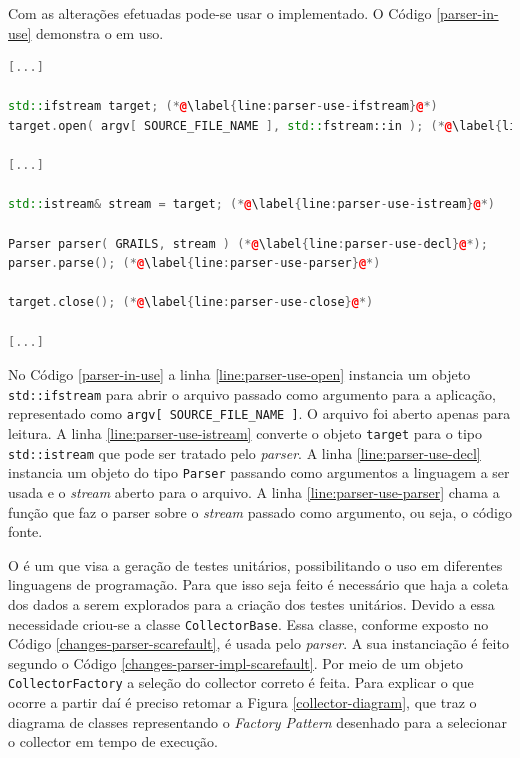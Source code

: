 Com as alterações efetuadas pode-se usar o \parser implementado. O Código
\ref{parser-in-use} demonstra o \parser em uso.

\begin{lstlisting}[language=C++, label=parser-in-use, caption=\textsf{Parser} em uso]
[...]

std::ifstream target; (*@\label{line:parser-use-ifstream}@*)
target.open( argv[ SOURCE_FILE_NAME ], std::fstream::in ); (*@\label{line:parser-use-open}@*)

[...]

std::istream& stream = target; (*@\label{line:parser-use-istream}@*)

Parser parser( GRAILS, stream ) (*@\label{line:parser-use-decl}@*);
parser.parse(); (*@\label{line:parser-use-parser}@*)

target.close(); (*@\label{line:parser-use-close}@*)

[...]
\end{lstlisting}

No Código \ref{parser-in-use} a linha \ref{line:parser-use-open} instancia um
objeto \lstinline|std::ifstream| para abrir o arquivo passado como argumento para
a aplicação, representado como \lstinline|argv[ SOURCE_FILE_NAME ]|. O arquivo foi
aberto apenas para leitura. A linha \ref{line:parser-use-istream} converte o
objeto \lstinline|target| para o tipo \lstinline|std::istream| que pode ser tratado
pelo \textit{parser}. A linha \ref{line:parser-use-decl} instancia um objeto do
tipo \lstinline|Parser| passando como argumentos a linguagem a ser usada e o
\textit{stream} aberto para o arquivo. A linha \ref{line:parser-use-parser} chama
a função que faz o {parser} sobre o \textit{stream} passado como argumento, ou seja,
o código fonte.

O \scarefault é um \framework que visa a geração de testes unitários, possibilitando
o uso em diferentes linguagens de programação. Para que isso seja feito é necessário
que haja a coleta dos dados a serem explorados para a criação dos testes unitários.
Devido a essa necessidade criou-se a classe \lstinline|CollectorBase|. Essa classe,
conforme exposto no Código \ref{changes-parser-scarefault}, é usada pelo \textit{parser}.
A sua instanciação é feito segundo o Código \ref{changes-parser-impl-scarefault}. Por
meio de um objeto \lstinline|CollectorFactory| a seleção do \textsf{collector} correto
é feita. Para explicar o que ocorre a partir daí é preciso retomar a Figura
\ref{collector-diagram}, que traz o diagrama de classes representando o
\textit{Factory Pattern} desenhado para a selecionar o \textsf{collector} em tempo
de execução.

